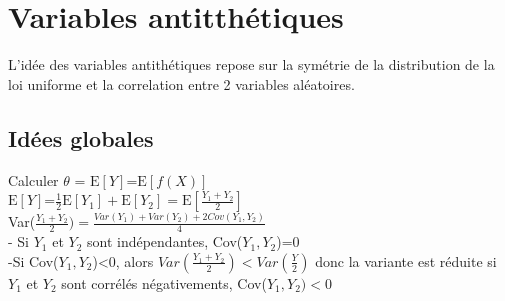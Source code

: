 \documentclass[12pt]{report}
\begin{document}
\section{Variables antitthétiques}
L’idée des variables antithétiques repose sur la symétrie de la
distribution de la loi uniforme et la correlation entre 2
variables aléatoires.
\subsection{Idées globales}
Calculer $\theta$ = $\text{E}[Y]$=$\text{E}[f(X)]$\\
$\text{E}[Y]$=$\frac{1}{2}$$\text{E}[Y_1]+\text{E}[Y_2]=\text{E}[\frac{Y_1+Y_2}{2}]$\\
Var($\frac{Y_1+Y_2}{2})=\frac{Var(Y_1)+Var(Y_2)+2Cov(Y_1,Y_2)}{4}$\\
- Si $Y_1$ et $Y_2$ sont indépendantes, Cov($Y_1,Y_2$)=0\\
-Si Cov($Y_1,Y_2$)<0, alors $Var(\frac{Y_1+Y_2}{2})<Var(\frac{Y}{2})$ donc la variante est réduite si $Y_1$ et $Y_2$ sont corrélés négativements, Cov($Y_1,Y_2)<$0\\\\
\end{document}
